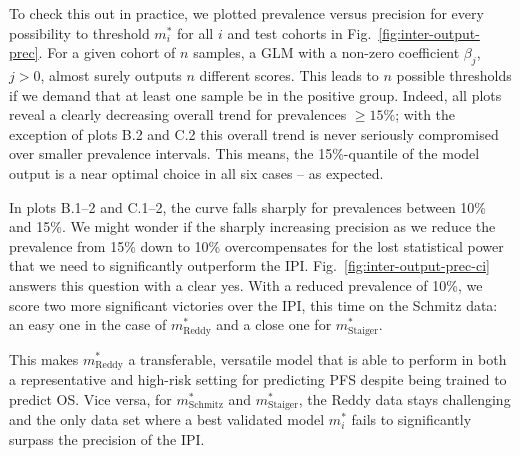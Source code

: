 To check this out in practice, we plotted prevalence versus precision for every possibility to 
threshold $m^*_i$ for all $i$ and test cohorts in Fig.\ \ref{fig:inter-output-prec}. For a given 
cohort of $n$ samples, a GLM with a non-zero coefficient $\beta_j$, $j > 0$, almost surely 
outputs $n$ different scores. This leads to $n$ possible thresholds if we demand that at least one 
sample be in the positive group. Indeed, all 
plots reveal a clearly decreasing overall trend for prevalences $\geq \num{15}\%$; with the 
exception of plots B.2 and C.2 this overall trend is never seriously compromised over smaller 
prevalence intervals. This means, the \num{15}\%-quantile of the model output is a near optimal 
choice in all six cases -- as expected.

In plots B.1--2 and C.1--2, the curve falls sharply for prevalences between \num{10}\% and \num{15}\%. 
We might wonder if the sharply increasing precision as we reduce the prevalence from \num{15}\% 
down to \num{10}\% overcompensates for the lost statistical power that we need to significantly 
outperform the IPI. Fig.\ \ref{fig:inter-output-prec-ci} answers this question with a clear yes.
With a reduced prevalence of \num{10}\%, we score two more significant victories over the IPI, this 
time on the Schmitz data: an easy one in the case of $m^*_\text{Reddy}$ and a close one
for $m^*_\text{Staiger}$. 

This makes $m^*_\text{Reddy}$ a transferable, versatile model that is 
able to perform in both a representative and high-risk setting for predicting PFS despite being 
trained to predict OS. Vice versa, for $m^*_\text{Schmitz}$ and $m^*_\text{Staiger}$, the Reddy data 
stays challenging and the only data set where a best validated model $m^*_i$ fails to significantly 
surpass the precision of the IPI.